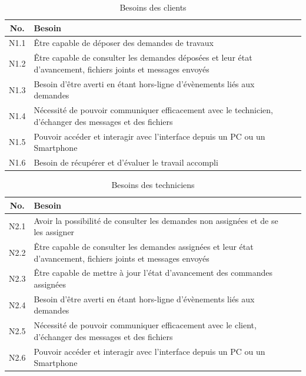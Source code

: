 \documentclass[
    iai, %
    eai, %
]{heig-tb}
\begin{document}
\begin{table}[h]
  \begin{center}
    \caption{Besoins des clients}
    \begin{tabularx}{\textwidth}{cXc}
      No.  & Besoin                                                                                                         \\ \toprule
      N1.1 & Être capable de déposer des demandes de travaux                                                                \\ \midrule
      N1.2 & Être capable de consulter les demandes déposées et leur état d'avancement, fichiers joints et messages envoyés \\ \midrule
      N1.3 & Besoin d'être averti en étant hors-ligne d'évènements liés aux demandes                                        \\ \midrule
      N1.4 & Nécessité de pouvoir communiquer efficacement avec le technicien, d'échanger des messages et des fichiers      \\ \midrule
      N1.5 & Pouvoir accéder et interagir avec l'interface depuis un PC ou un Smartphone                                    \\ \midrule
      N1.6 & Besoin de récupérer et d'évaluer le travail accompli                                                           \\ \midrule
    \end{tabularx}
  \end{center}
\end{table}

\begin{table}[h]
  \begin{center}
    \caption{Besoins des techniciens}
    \begin{tabularx}{\textwidth}{cXc}
      No.  & Besoin                                                                                                          \\ \toprule
      N2.1 & Avoir la possibilité de consulter les demandes non assignées et de se les assigner                              \\ \midrule
      N2.2 & Être capable de consulter les demandes assignées et leur état d'avancement, fichiers joints et messages envoyés \\ \midrule
      N2.3 & Être capable de mettre à jour l'état d'avancement des commandes assignées                                       \\ \midrule
      N2.4 & Besoin d'être averti en étant hors-ligne d'évènements liés aux demandes                                         \\ \midrule
      N2.5 & Nécessité de pouvoir communiquer efficacement avec le client, d'échanger des messages et des fichiers           \\ \midrule
      N2.6 & Pouvoir accéder et interagir avec l'interface depuis un PC ou un Smartphone                                     \\ \midrule
    \end{tabularx}
  \end{center}
\end{table}
\end{document}
